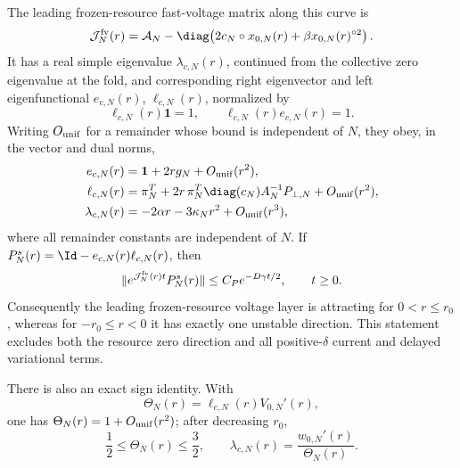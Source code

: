 \begin{proposition}
The leading frozen-resource fast-voltage matrix along this curve is
\begin{equation}
 \mathcal J^{\rm fv}_{N}(r)=\mathcal A_N-\diag\!\left(
       2c_N\circ x_{0,N}(r)+\beta x_{0,N}(r)^{\circ2}
                                  \right).            \label{eq:outer-layer-jacobian}
\end{equation}
It has a real simple eigenvalue \(\lambda_{c,N}(r)\), continued from the
collective zero eigenvalue at the fold, and corresponding right eigenvector
and left eigenfunctional \(e_{c,N}(r)\), \(\ell_{c,N}(r)\), normalized by
\begin{equation}
 \ell_{c,N}(r)\mathbf1=1,
 \qquad \ell_{c,N}(r)e_{c,N}(r)=1.                  \label{eq:outer-eigen-normalization}
\end{equation}
Writing \(O_{\rm unif}\) for a remainder whose bound is independent of
\(N\), they obey, in the vector and dual norms,
\begin{align}
 e_{c,N}(r)&=\mathbf1+2rg_N+O_{\rm unif}(r^2),\notag\\
 \ell_{c,N}(r)&=\pi_N^T
   +2r\,\pi_N^T\diag(c_N)A_N^{-1}P_{\perp,N}+O_{\rm unif}(r^2),\notag\\
 \lambda_{c,N}(r)&=-2\alpha r-3\kappa_Nr^2+O_{\rm unif}(r^3),
                                                               \label{eq:outer-eigen-expansion}
\end{align}
where all remainder constants are independent of \(N\).  If
\(P^s_N(r)=\Id-e_{c,N}(r)\ell_{c,N}(r)\), then
\begin{equation}
 \|e^{\mathcal J^{\rm fv}_{N}(r)t}P^s_N(r)\|
 \le C_Pe^{-D\gamma t/2},\qquad t\ge0.              \label{eq:outer-stable-layer-semigroup}
\end{equation}
Consequently the leading frozen-resource voltage layer is attracting for
\(0<r\le r_0\), whereas for \(-r_0\le r<0\) it has exactly one unstable
direction.  This statement excludes both the resource zero direction and all
positive-\(\delta\) current and delayed variational terms.

There is also an exact sign identity.  With
\begin{equation}
 \Theta_N(r)=\ell_{c,N}(r)V_{0,N}'(r),               \label{eq:outer-theta}
\end{equation}
one has \(\Theta_N(r)=1+O_{\rm unif}(r^2)\); after decreasing \(r_0\),
\begin{equation}
 \frac12\le\Theta_N(r)\le\frac32,
 \qquad
 \lambda_{c,N}(r)=\frac{w_{0,N}'(r)}{\Theta_N(r)}.  \label{eq:outer-eigen-identity}
\end{equation}
\end{proposition}

